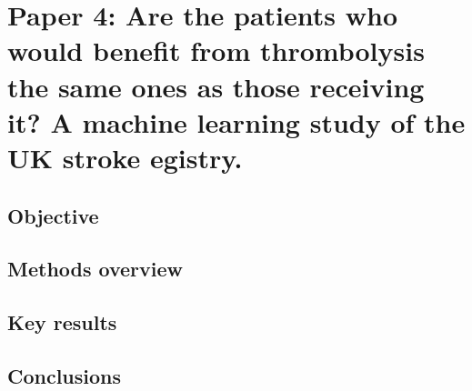 \section{Paper 4: Are the patients who would benefit from thrombolysis the same ones as those receiving it? A machine learning study of the UK stroke egistry.\cite{pearn_are_2024}}\label{sec:paper_4}

\subsection{Objective}

\subsection{Methods overview}

\subsection{Key results}

\subsection{Conclusions}